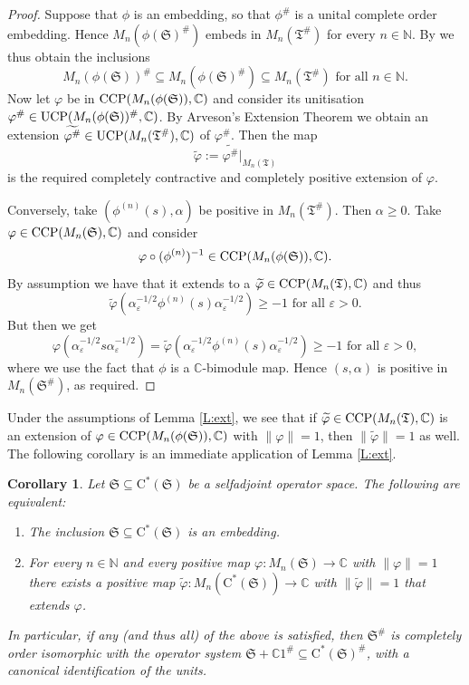 \documentclass[11pt, draft]{amsart}
\numberwithin{equation}{section}
\theoremstyle{plain}
\newtheorem{corollary}[theorem]{Corollary}
\theoremstyle{definition}
\theoremstyle{remark}
\newcommand{\eps}{\varepsilon}
\def\al{\alpha}
\newcommand\vphi{\varphi}
\newcommand{\bC}{\mathbb{C}}
\newcommand{\bN}{\mathbb{N}}
\newcommand{\fS}{{\mathfrak{S}}}
\newcommand{\fT}{{\mathfrak{T}}}
\newcommand{\foral}{\text{ for all }}
\newcommand{\ca}{\mathrm{C}^*}
\newcommand{\wt}{\widetilde}
\begin{document}
\begin{proof}
Suppose that $\phi$ is an embedding, so that $\phi^\#$ is a unital complete order embedding.
Hence $M_n(\phi(\fS)^\#)$ embeds in $M_n(\fT^\#)$ for every $n\in\bN$.
By \cite[Corollary 4.4]{Wer02} we thus obtain the inclusions
\[
M_n(\phi(\fS))^\# \subseteq M_n(\phi(\fS)^\#) \subseteq M_n(\fT^\#)
\foral 
n \in \bN.
\]
Now let $\vphi$ be in ${\rm CCP}(M_n(\phi(\fS)), \bC)$ and consider its unitisation $\vphi^\# \in {\rm UCP}(M_n(\phi(\fS))^\#, \bC)$.
By Arveson's Extension Theorem we obtain an extension $\wt{\vphi^\#} \in {\rm UCP}(M_n(\fT^\#), \bC)$ of $\vphi^\#$.
Then the map 
\[
\wt{\vphi} := \wt{\vphi^\#}|_{M_n(\fT)}
\]
is the required completely contractive and completely positive extension of $\vphi$.

Conversely, take $(\phi^{(n)}(s), \al)$ be positive in $M_n(\fT^\#)$.
Then $\al \geq 0$.
Take $\vphi \in {\rm CCP}(M_n(\fS),\bC)$ and consider 
\[
\vphi \circ (\phi^{(n)})^{-1} \in {\rm CCP}(M_n(\phi(\fS)), \bC).
\]
By assumption we have that it extends to a $\wt{\vphi} \in {\rm CCP}(M_n(\fT), \bC)$ and thus
\[
\wt{\vphi}(\al_{\eps}^{-1/2} \phi^{(n)}(s) \al_{\eps}^{-1/2})
\geq
-1
\foral 
\eps>0.
\]
But then we get
\[
\vphi(\al_{\eps}^{-1/2} s \al_{\eps}^{-1/2})
=
\wt{\vphi}(\al_{\eps}^{-1/2} \phi^{(n)}(s) \al_{\eps}^{-1/2})
\geq
-1
\foral 
\eps>0,
\]
where we use the fact that $\phi$ is a $\bC$-bimodule map.
Hence $(s,\al)$ is positive in $M_n(\fS^\#)$, as required.
\end{proof}

Under the assumptions of Lemma \ref{L:ext}, we see that if $\wt{\vphi} \in {\rm CCP}(M_n(\fT), \bC)$ is an extension of $\vphi \in {\rm CCP}(M_n(\phi(\fS)), \bC)$ with $\| \vphi \| = 1$, then $\|\wt{\vphi}\| = 1$ as well.
The following corollary is an immediate application of Lemma \ref{L:ext}.

\begin{corollary} \label{C:ext}
Let $\fS \subseteq \ca(\fS)$ be a selfadjoint operator space. 
The following are equivalent:
\begin{enumerate}
\item The inclusion $\fS \subseteq \ca(\fS)$ is an embedding.
\item For every $n\in \bN$ and every positive map $\vphi\colon M_n(\fS)\to \bC$ with $\|\vphi\|=1$ there exists a positive map $\wt{\vphi}\colon M_n(\ca(\fS))\to \bC$ with $\|\wt{\vphi}\|=1$ that extends $\vphi$. 
\end{enumerate}
In particular, if any (and thus all) of the above is satisfied, then $\fS^\#$ is completely order isomorphic with the operator system $\fS+\bC 1^\#\subseteq \ca(\fS)^{\#}$, with a canonical identification of the units.
\end{corollary}
\end{document}
